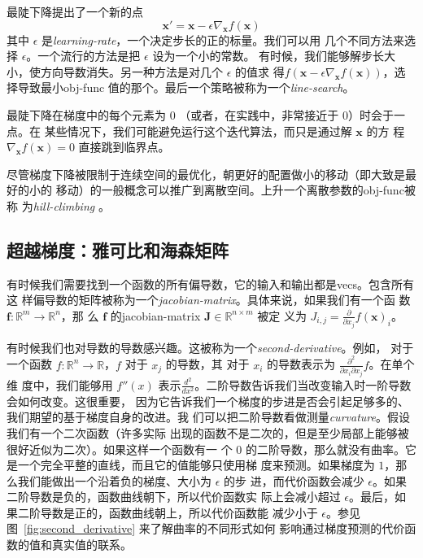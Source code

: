 最陡下降提出了一个新的点
\begin{equation}
  \pmb{x}' = \pmb{x} - \epsilon\nabla_{\pmb{x}}f(\pmb{x})
\end{equation}
其中 $\epsilon$ 是\emph{\gls{learning-rate}}，一个决定步长的正的标量。我们可以用
几个不同方法来选择 $\epsilon$。一个流行的方法是把 $\epsilon$ 设为一个小的常数。
有时候，我们能够解步长大小，使方向导数消失。另一种方法是对几个 $\epsilon$ 的值求
得$f(\pmb{x} - \epsilon\nabla_{\pmb{x}}f(\pmb{x}))$，选择导致最小\gls*{obj-func}
值的那个。最后一个策略被称为一个\emph{\gls{line-search}}。

最陡下降在梯度中的每个元素为 $0$ （或者，在实践中，非常接近于 $0$）时会于一点。在
某些情况下，我们可能避免运行这个迭代算法，而只是通过解 $\pmb{x}$ 的方
程 $\nabla_{\pmb{x}}f(\pmb{x}) = 0$ 直接跳到临界点。

尽管梯度下降被限制于连续空间的最优化，朝更好的配置做小的移动（即大致是最好的小的
移动）的一般概念可以推广到离散空间。上升一个离散参数的\gls*{obj-func}被称
为\emph{\gls{hill-climbing}} \citep{Russel+Norvig-book2003}。

\subsection{超越梯度：雅可比和海森矩阵}
\label{subsec:beyong_the_gradient}

有时候我们需要找到一个函数的所有偏导数，它的输入和输出都是\gls*{vecs}。包含所有这
样偏导数的矩阵被称为一个\emph{\gls{jacobian-matrix}}。具体来说，如果我们有一个函
数 $\pmb{f}: \mathbb{R}^m \rightarrow \mathbb{R}^n$，那
么 $\pmb{f}$ 的\gls*{jacobian-matrix} $\pmb{J} \in \mathbb{R}^{n \times m}$ 被定
义为 $J_{i,j} = \frac{\partial}{\partial x_j}f(\pmb{x})_i$。

有时候我们也对导数的导数感兴趣。这被称为一个\emph{\gls{second-derivative}}。例如，
对于一个函数 $f: \mathbb{R}^n \rightarrow \mathbb{R}$，$f$ 对于 $x_j$ 的导数，其
对于 $x_i$ 的导数表示为 $\frac{\partial^2}{\partial x_i \partial x_j}f$。在单个维
度中，我们能够用 $f''(x)$
表示$\frac{d^2}{dx^2}$。二阶导数告诉我们当改变输入时一阶导数会如何改变。这很重要，
因为它告诉我们一个梯度的步进是否会引起足够多的、我们期望的基于梯度自身的改进。我
们可以把二阶导数看做测量\emph{\gls{curvature}}。假设我们有一个二次函数（许多实际
出现的函数不是二次的，但是至少局部上能够被很好近似为二次）。如果这样一个函数有一
个 $0$ 的二阶导数，那么就没有曲率。它是一个完全平整的直线，而且它的值能够只使用梯
度来预测。如果梯度为 $1$，那么我们能做出一个沿着负的梯度、大小为 $\epsilon$ 的步
进，而代价函数会减少 $\epsilon$。如果二阶导数是负的，函数曲线朝下，所以代价函数实
际上会减小超过 $\epsilon$。最后，如果二阶导数是正的，函数曲线朝上，所以代价函数能
减少小于 $\epsilon$。参见图~\ref{fig:second_derivative} 来了解曲率的不同形式如何
影响通过梯度预测的代价函数的值和真实值的联系。

